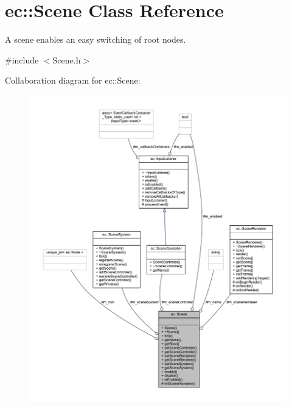 \hypertarget{classec_1_1_scene}{}\section{ec\+:\+:Scene Class Reference}
\label{classec_1_1_scene}


A scene enables an easy switching of root nodes.  




{\ttfamily \#include $<$Scene.\+h$>$}



Collaboration diagram for ec\+:\+:Scene\+:\nopagebreak
\begin{figure}[H]
\begin{center}
\leavevmode
\includegraphics[width=350pt]{classec_1_1_scene__coll__graph}
\end{center}
\end{figure}
